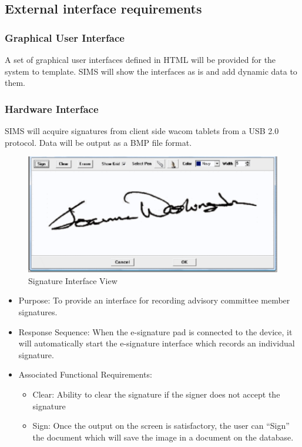 \documentclass[11pt,a4paper]{report}
\begin{document}
\subsection{External interface requirements }
\subsubsection{ Graphical User Interface }
A set of graphical user interfaces defined in HTML will be provided for the system to template. SIMS will show the interfaces as is and add dynamic data to them. 
\subsubsection{ Hardware Interface }
SIMS will acquire signatures from client side wacom tablets from a USB 2.0 protocol. Data will be output as a BMP file format. 

\begin{figure}[htp]
\centering
\includegraphics[scale=0.75]{diagrams/HTMLTemplating/Figure6.png}
\caption{Signature Interface View}
\label{fig:signature}
\end{figure}

\begin{itemize}
\item Purpose: To provide an interface for recording advisory committee member signatures.
\item Response Sequence: When the e-signature pad is connected to the device, it will automatically start the e-signature interface which records an individual signature.
\item Associated Functional Requirements:
\begin{itemize}
\item Clear: Ability to clear the signature if the signer does not accept the signature
\item Sign: Once the output on the screen is satisfactory, the user can “Sign” the document which will save the image in a document on the database.
\end{itemize}
\end{itemize}
\end{document}
